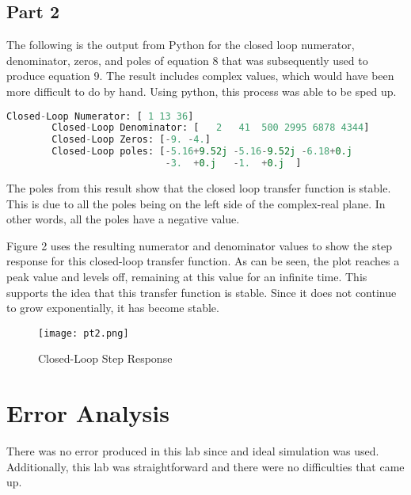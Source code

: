\documentclass[12pt, titlepage]{article}
\begin{document}
    \clearpage
    
    \subsection{Part 2}
    The following is the output from Python for the closed loop numerator, denominator, zeros, and poles of equation 8 that was subsequently used to produce equation 9.  The result includes complex values, which would have been more difficult to do by hand.  Using python, this process was able to be sped up.
    
      \begin{lstlisting}[language=Python]  
        Closed-Loop Numerator: [ 1 13 36] 
        Closed-Loop Denominator: [   2   41  500 2995 6878 4344]
        Closed-Loop Zeros: [-9. -4.] 
        Closed-Loop poles: [-5.16+9.52j -5.16-9.52j -6.18+0.j   
                            -3.  +0.j   -1.  +0.j  ]
        \end{lstlisting}
    
    The poles from this result show that the closed loop transfer function is stable.  This is due to all the poles being on the left side of the complex-real plane.  In other words, all the poles have a negative value.
    
    Figure 2 uses the resulting numerator and denominator values to show the step response for this closed-loop transfer function.  As can be seen, the plot reaches a peak value and levels off, remaining at this value for an infinite time.  This supports the idea that this transfer function is stable.  Since it does not continue to grow exponentially, it has become stable.
    
    \begin{figure}[h!]
        \centering
        \texttt{[image: pt2.png]}
        \caption{Closed-Loop Step Response}
        \label{fig:my_label}
    \end{figure}
    
    
        
        \clearpage
    \section{Error Analysis}
    There was no error produced in this lab since and ideal simulation was used.  Additionally, this lab was straightforward and there were no difficulties that came up.
    
\end{document}
